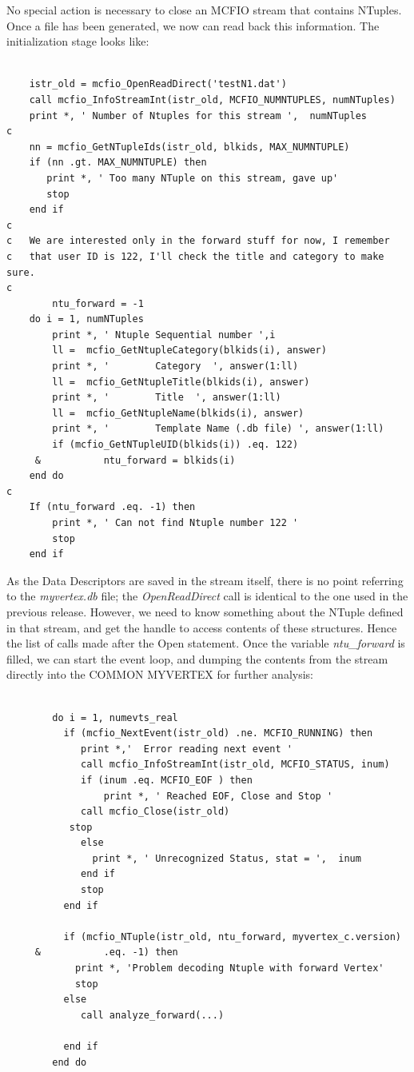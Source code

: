 	No special action is necessary to close an MCFIO stream that
contains NTuples.  Once a file has been generated, we now can read back this
information.  The initialization stage looks like:

\begin{verbatim}

	istr_old = mcfio_OpenReadDirect('testN1.dat')
	call mcfio_InfoStreamInt(istr_old, MCFIO_NUMNTUPLES, numNTuples)
	print *, ' Number of Ntuples for this stream ',  numNTuples
c
	nn = mcfio_GetNTupleIds(istr_old, blkids, MAX_NUMNTUPLE)
	if (nn .gt. MAX_NUMNTUPLE) then
	   print *, ' Too many NTuple on this stream, gave up'
	   stop
	end if
c
c	We are interested only in the forward stuff for now, I remember
c	that user ID is 122, I'll check the title and category to make sure.
c
        ntu_forward = -1
	do i = 1, numNTuples
	    print *, ' Ntuple Sequential number ',i
	    ll =  mcfio_GetNtupleCategory(blkids(i), answer)
	    print *, '        Category  ', answer(1:ll)
	    ll =  mcfio_GetNtupleTitle(blkids(i), answer)
	    print *, '        Title  ', answer(1:ll)
	    ll =  mcfio_GetNtupleName(blkids(i), answer)
	    print *, '        Template Name (.db file) ', answer(1:ll)
	    if (mcfio_GetNTupleUID(blkids(i)) .eq. 122)
     &           ntu_forward = blkids(i)
	end do
c
	If (ntu_forward .eq. -1) then
	    print *, ' Can not find Ntuple number 122 '
	    stop
	end if

\end{verbatim}

  	 As the Data Descriptors are saved in the stream itself, there
is no point referring to the {\em myvertex.db} file; the {\em OpenReadDirect}
call is identical to the one used in the previous release.  However, we need
to know something about the NTuple defined in that stream, and get the handle
to access contents of these structures.  Hence the list of calls made after
the Open statement. Once the variable {\em ntu\_forward} is filled, we can
start the event loop, and dumping the contents from the stream directly into
the COMMON MYVERTEX for further analysis:

\begin{verbatim}

        do i = 1, numevts_real
          if (mcfio_NextEvent(istr_old) .ne. MCFIO_RUNNING) then
             print *,'  Error reading next event '
             call mcfio_InfoStreamInt(istr_old, MCFIO_STATUS, inum)
             if (inum .eq. MCFIO_EOF ) then
                 print *, ' Reached EOF, Close and Stop '
	         call mcfio_Close(istr_old)
	       stop
             else
               print *, ' Unrecognized Status, stat = ',  inum
             end if
             stop
          end if

          if (mcfio_NTuple(istr_old, ntu_forward, myvertex_c.version)
     &           .eq. -1) then
            print *, 'Problem decoding Ntuple with forward Vertex'
            stop
          else
             call analyze_forward(...)

          end if
        end do

\end{verbatim}

